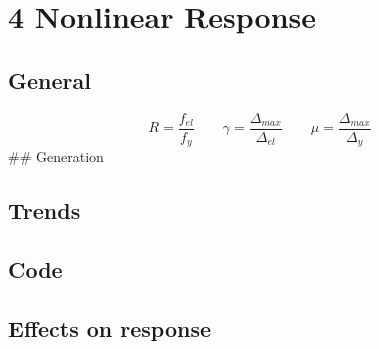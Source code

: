 \hypertarget{nonlinear-response}{%
\section{4 Nonlinear Response}\label{nonlinear-response}}

\hypertarget{general}{%
\subsection{General}\label{general}}

\[R = \dfrac{f_{el}}{f_{y}} \qquad \gamma = \dfrac{\Delta_{max}}{\Delta_{el}} \qquad \mu = \dfrac{\Delta_{max}}{\Delta_y}\]
\#\# Generation

\hypertarget{trends}{%
\subsection{Trends}\label{trends}}

\hypertarget{code}{%
\subsection{Code}\label{code}}

\hypertarget{effects-on-response}{%
\subsection{Effects on response}\label{effects-on-response}}
